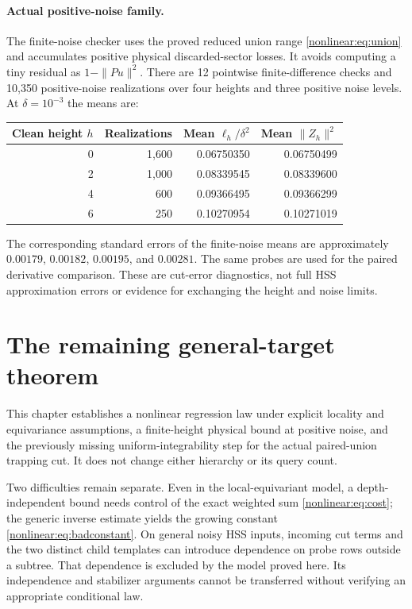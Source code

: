 \documentclass[11pt,oneside,openany,a4paper]{book}
\numberwithin{equation}{chapter}
\theoremstyle{definition}
\theoremstyle{remark}
\begin{document}
\paragraph{Actual positive-noise family.}
The finite-noise checker uses the proved reduced union range \eqref{nonlinear:eq:union} and accumulates positive physical discarded-sector losses. It avoids computing a tiny residual as $1-\|Pu\|^2$. There are 12 pointwise finite-difference checks and 10,350 positive-noise realizations over four heights and three positive noise levels. At $\delta=10^{-3}$ the means are:
\begin{center}
\begin{tabular}{rrrr}
\toprule Clean height $h$&Realizations&Mean $\ell_h/\delta^2$&Mean $\|Z_h\|^2$\\\midrule
0&1,600&0.06750350&0.06750499\\
2&1,000&0.08339545&0.08339600\\
4&600&0.09366495&0.09366299\\
6&250&0.10270954&0.10271019\\\bottomrule
\end{tabular}
\end{center}
The corresponding standard errors of the finite-noise means are approximately $0.00179$, $0.00182$, $0.00195$, and $0.00281$. The same probes are used for the paired derivative comparison. These are cut-error diagnostics, not full HSS approximation errors or evidence for exchanging the height and noise limits.

\section{The remaining general-target theorem}
This chapter establishes a nonlinear regression law under explicit locality and equivariance assumptions, a finite-height physical bound at positive noise, and the previously missing uniform-integrability step for the actual paired-union trapping cut. It does not change either hierarchy or its query count.

Two difficulties remain separate. Even in the local-equivariant model, a depth-independent bound needs control of the exact weighted sum \eqref{nonlinear:eq:cost}; the generic inverse estimate yields the growing constant \eqref{nonlinear:eq:badconstant}. On general noisy HSS inputs, incoming cut terms and the two distinct child templates can introduce dependence on probe rows outside a subtree. That dependence is excluded by the model proved here. Its independence and stabilizer arguments cannot be transferred without verifying an appropriate conditional law.
\end{document}
